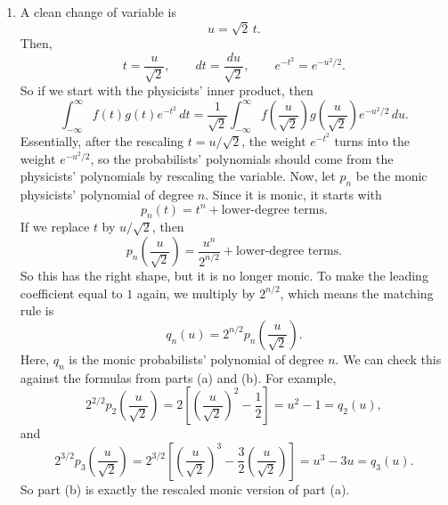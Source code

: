 \documentclass[10pt]{extarticle}
\begin{document}
\begin{enumerate}[label=(\alph*)]
So the first five monic probabilists' Hermite polynomials are
\[
1,\qquad
t,\qquad
t^2-1,\qquad
t^3-3t,\qquad
t^4-6t^2+3.
\]

\item A clean change of variable is
\[
u=\sqrt{2}\,t.
\]
Then,
\[
t=\frac{u}{\sqrt{2}},
\qquad
dt=\frac{du}{\sqrt{2}},
\qquad
e^{-t^2}=e^{-u^2/2}.
\]
So if we start with the physicists' inner product, then
\[
\int_{-\infty}^{\infty} f(t)g(t)e^{-t^2}\,dt
=\frac{1}{\sqrt{2}}\int_{-\infty}^{\infty}
f\!\left(\frac{u}{\sqrt{2}}\right)
g\!\left(\frac{u}{\sqrt{2}}\right)
e^{-u^2/2}\,du.
\]
Essentially, after the rescaling $t=u/\sqrt{2}$, the weight $e^{-t^2}$ turns into the weight $e^{-u^2/2}$, so the probabilists' polynomials should come from the physicists' polynomials by rescaling the variable. Now, let $p_n$ be the monic physicists' polynomial of degree $n$. Since it is monic, it starts with
\[
p_n(t)=t^n+\text{lower-degree terms}.
\]
If we replace $t$ by $u/\sqrt{2}$, then
\[
p_n\!\left(\frac{u}{\sqrt{2}}\right)
=\frac{u^n}{2^{n/2}}+\text{lower-degree terms}.
\]
So this has the right shape, but it is no longer monic. To make the leading coefficient equal to $1$ again, we multiply by $2^{n/2}$, which means the matching rule is
\[
q_n(u)=2^{n/2}p_n\!\left(\frac{u}{\sqrt{2}}\right).
\]
Here, $q_n$ is the monic probabilists' polynomial of degree $n$. We can check this against the formulas from parts (a) and (b). For example,
\[
2^{2/2}p_2\!\left(\frac{u}{\sqrt{2}}\right)
=2\left[\left(\frac{u}{\sqrt{2}}\right)^2-\frac{1}{2}\right]
=u^2-1
=q_2(u),
\]
and
\[
2^{3/2}p_3\!\left(\frac{u}{\sqrt{2}}\right)
=2^{3/2}\left[\left(\frac{u}{\sqrt{2}}\right)^3-\frac{3}{2}\left(\frac{u}{\sqrt{2}}\right)\right]
=u^3-3u
=q_3(u).
\]
So part (b) is exactly the rescaled monic version of part (a).
\end{enumerate}
\end{document}

